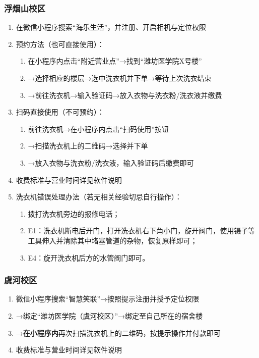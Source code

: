 \subsubsection[浮烟山校区]{浮烟山校区}
\label{washing_machine_f}
\begin{enumerate}
    \item 在微信小程序搜索“海乐生活”，并注册、开启相机与定位权限
    \item 预约方法（也可直接使用）：
          \begin{enumerate}
              \item 在小程序内点击“附近营业点”→找到“潍坊医学院X号楼”
              \item →选择相应的楼层→选中洗衣机并下单→等待上次洗衣结束
              \item →前往洗衣机→输入验证码→放入衣物与洗衣粉/洗衣液并缴费
          \end{enumerate}
    \item 扫码直接使用（不可预约）：
          \begin{enumerate}
              \item 前往洗衣机→在小程序内点击“扫码使用”按钮
              \item →扫描洗衣机上的二维码→选择并下单
              \item →放入衣物与洗衣粉/洗衣液，输入验证码后缴费即可
          \end{enumerate}
    \item 收费标准与营业时间详见软件说明
    \item 洗衣机错误处理办法（若无相关经验切忌自行操作）：
          \begin{enumerate}
              \item 拨打洗衣机旁边的报修电话；
              \item E1：洗衣机断电后开门，打开洗衣机右下角小门，旋开阀门，使用镊子等工具伸入并清除其中堵塞管道的杂物，恢复原样即可；
              \item E4：旋开洗衣机后方的水管阀门即可。
          \end{enumerate}
\end{enumerate}
\subsubsection[虞河校区]{虞河校区}
\label{washing_machine_y}
\begin{enumerate}
    \item 微信小程序搜索“智慧笑联”→按照提示注册并授予定位权限
    \item →绑定“潍坊医学院（虞河校区）”→绑定至自己所在的宿舍楼
    \item →\textbf{在小程序内}再次扫描洗衣机上的二维码，按提示操作并付款即可
    \item 收费标准与营业时间详见软件说明
\end{enumerate}

